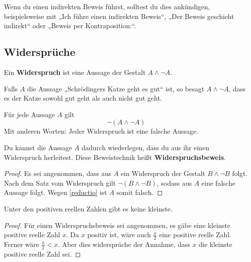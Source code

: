   
\begin{bem}
    Wenn du einen indirekten Beweis führst, solltest du dies ankündigen, beispielsweise mit „Ich führe einen indirekten Beweis“, „Der Beweis geschieht indirekt“ oder „Beweis per Kontraposition:“.
\end{bem}





\subsection*{Widersprüche}


\begin{defin} 
    Ein \textbf{Widerspruch} ist eine Aussage der Gestalt $A\land \neg A$.
\end{defin}


\begin{bsp}
    Falls $A$ die Aussage „Schrödingers Katze geht es gut“ ist, so besagt $A\land \neg A$, dass es der Katze sowohl gut geht als auch nicht gut geht.
\end{bsp}


\begin{axiom} 
    Für jede Aussage $A$ gilt
        \[ \neg(A\land \neg A) \]
    Mit anderen Worten: Jeder Widerspruch ist eine falsche Aussage.
\end{axiom}


\begin{satz} \label{widerspruchsbeweis} 
    Du kannst die Aussage $A$ dadurch wiederlegen, dass du aus ihr einen Widerspruch herleitest. Diese Beweistechnik heißt \textbf{Widerspruchsbeweis}.
\end{satz}
\begin{proof}
    Es sei angenommen, dass aus $A$ ein Widerspruch der Gestalt $B\land \neg B$ folgt. Nach dem Satz vom Widerspruch gilt $\neg (B\land \neg B)$, sodass aus $A$ eine falsche Aussage folgt. Wegen \cref{reductio} ist $A$ somit falsch.
\end{proof}

  
\begin{bsp} \label{bsp:widerspruchsbeweis}
    Unter den positiven reellen Zahlen gibt es keine kleinste.
\end{bsp}
\begin{proof}
    Für einen Widerspruchsbeweis sei angenommen, es gäbe eine kleinste positive reelle Zahl $x$. Da $x$ positiv ist, wäre auch $\frac{x}{2}$ eine positive reelle Zahl. Ferner wäre $\frac{x}{2}<x$. Aber dies widerspräche der Annahme, dass $x$ die kleinste positive reelle Zahl sei.
\end{proof}
  
